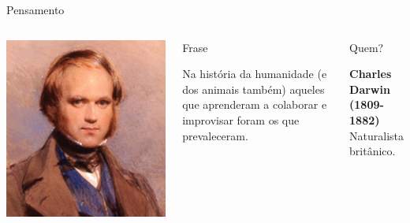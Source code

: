 \documentclass[xcolor=dvipsnames,table]{beamer}
\begin{document}
	\begin{frame}{Pensamento}
		\begin{columns}
		  		\begin{center}
		    		\includegraphics[height=.6\textheight]{images/darwin.jpg}
		  		\end{center}
				\begin{block}{Frase}
					\begin{center}
						{\large Na história da humanidade (e dos animais também) aqueles que aprenderam a colaborar e improvisar foram os que prevaleceram.}
					\end{center}
				\end{block}		  		
		  		\begin{block}{Quem?}
		  			\begin{center}
						{\bf Charles Darwin (1809-1882)} \\ Naturalista britânico.
					\end{center}
				\end{block}
		\end{columns}
	\end{frame}
	
\end{document}
